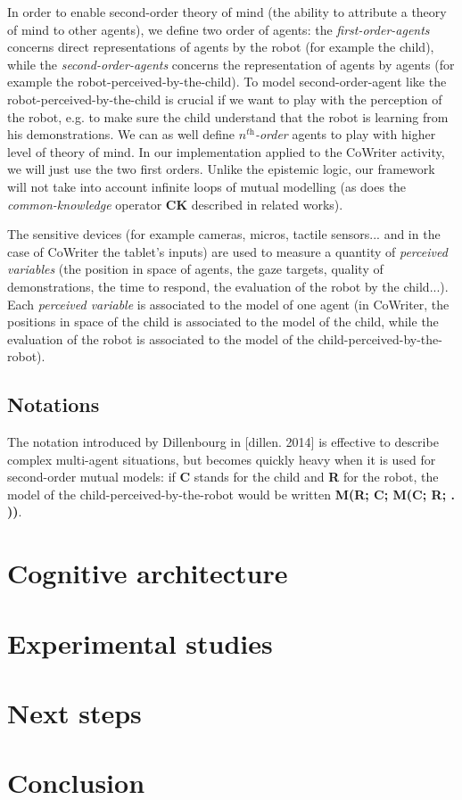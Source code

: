 \documentclass[10pt,a4paper,twocolumn]{article}
\begin{document}
In order to enable second-order theory of mind (the ability to attribute a theory of mind to other agents), we define two order of agents: the \textit{first-order-agents} concerns direct representations of agents by the robot (for example the child), while the \textit{second-order-agents} concerns the representation of agents by agents (for example the robot-perceived-by-the-child). To model second-order-agent like the robot-perceived-by-the-child is crucial if we want to play with the perception of the robot, e.g. to make sure the child understand that the robot is learning from his demonstrations. We can as well define \textit{$n^{\textit{th}}$-order} agents to play with higher level of theory of mind. In our implementation applied to the CoWriter activity, we will just use the two first orders. Unlike the epistemic logic, our framework will not take into account infinite loops of mutual modelling (as does the \textit{common-knowledge} operator \textbf{CK} described in related works). 

The sensitive devices (for example cameras, micros, tactile sensors... and in the case of CoWriter the tablet's inputs) are used to measure a quantity of \textit{perceived variables} (the position in space of agents, the gaze targets, quality of demonstrations, the time to respond, the evaluation of the robot by the child...). Each \textit{perceived variable} is associated to the model of one agent (in CoWriter, the positions in space of the child is associated to the model of the child, while the evaluation of the robot is associated to the model of the child-perceived-by-the-robot). 

\subsection{Notations}
The notation introduced by Dillenbourg in [dillen. 2014] is effective to describe complex multi-agent situations, but becomes quickly heavy when it is used for second-order mutual models: if \textbf{C} stands for the child and \textbf{R} for the robot, the model of the child-perceived-by-the-robot would be written \textbf{M(R; C; M(C; R; . ))}.


\section{Cognitive architecture}

\section{Experimental studies}

\section{Next steps}

\section{Conclusion}





 
\end{document}
